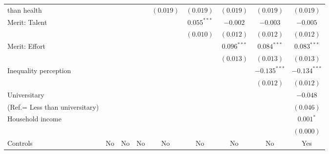\documentclass[
  12pt,
  10pt]{article}
\begin{document}
\begin{table}
{\begin{center}
{\begin{tabular}{l c c c c c c c c}
than health                                 &                &                &                & $(0.019)$      & $(0.019)$      & $(0.019)$      & $(0.019)$      & $(0.019)$      \\
Merit: Talent                               &                &                &                &                & $0.055^{***}$  & $-0.002$       & $-0.003$       & $-0.005$       \\
                                            &                &                &                &                & $(0.010)$      & $(0.012)$      & $(0.012)$      & $(0.012)$      \\
Merit: Effort                               &                &                &                &                &                & $0.096^{***}$  & $0.084^{***}$  & $0.083^{***}$  \\
                                            &                &                &                &                &                & $(0.013)$      & $(0.013)$      & $(0.013)$      \\
Inequality perception                       &                &                &                &                &                &                & $-0.135^{***}$ & $-0.134^{***}$ \\
                                            &                &                &                &                &                &                & $(0.012)$      & $(0.012)$      \\
Universitary                                &                &                &                &                &                &                &                & $-0.048$       \\
(Ref.= Less than universitary)              &                &                &                &                &                &                &                & $(0.046)$      \\
Household income                            &                &                &                &                &                &                &                & $0.001^{*}$    \\
                                            &                &                &                &                &                &                &                & $(0.000)$      \\
\hline
Controls                                    & No             & No             & No             & No             & No             & No             & No             & Yes            \\

\end{tabular}}
\end{center}}
\end{table}
\end{document}
